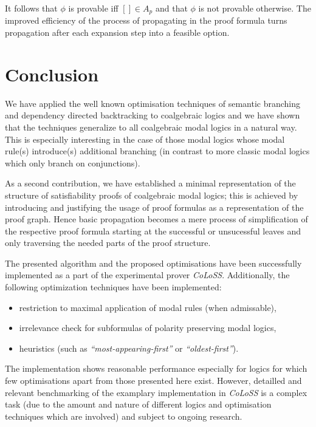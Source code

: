 \documentclass{llncs}
\begin{document}
It follows that $\phi$ is provable iff $[]\in A_p$ and that $\phi$ is not provable otherwise. The
improved efficiency of the process of propagating in the proof formula turns propagation after
each expansion step into a feasible option.

\section{Conclusion}  

We have applied the well known optimisation techniques of semantic branching and dependency directed
backtracking to coalgebraic logics and we have shown that the techniques generalize to all coalgebraic
modal logics in a natural way. This is especially interesting in the case of those modal logics
whose modal rule(s) introduce(s) additional branching (in contrast to more classic modal logics which only
branch on conjunctions).

As a second contribution, we have established a minimal representation of the structure of satisfiability
proofs of coalgebraic modal logics; this is achieved by introducing and justifying the usage of proof formulas
as a representation of the proof graph. Hence basic propagation becomes
a mere process of simplification of the respective proof formula starting at the successful or unsucessful
leaves and only traversing the needed parts of the proof structure.

The presented algorithm and the proposed optimisations have been successfully implemented as a part of the
experimental prover \emph{CoLoSS}. Additionally, the following optimization techniques have been implemented:
\begin{itemize}
\item restriction to maximal application of modal rules (when admissable),
\item irrelevance check for subformulas of polarity preserving modal logics,
\item heuristics (such as \emph{``most-appearing-first''} or \emph{``oldest-first''}).
\end{itemize}

The implementation shows reasonable performance especially for logics for
which few optimisations apart from those presented here exist.
However, detailled and relevant benchmarking of the examplary implementation in \emph{CoLoSS} is a complex task
(due to the amount and nature of different logics and optimisation techniques which are involved)
and subject to ongoing research.



\end{document}
